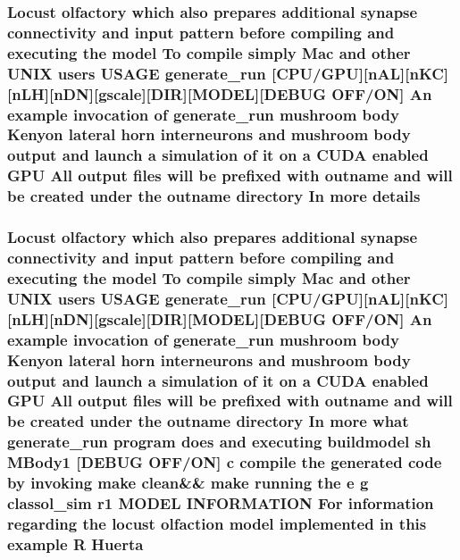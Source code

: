 \hypertarget{userproject_2MBody1__project_2README_8txt_a13ece3471fd6716c3062972374285e7d}{
\subsubsection[{details}]{\setlength{\rightskip}{0pt plus 5cm}Locust olfactory which also prepares additional synapse connectivity and input pattern before compiling and executing the {\bf model} To compile simply Mac and other U\+N\+I\+X users U\+S\+A\+G\+E {\bf generate\+\_\+run} \mbox{[}{\bf C\+P\+U}/{\bf G\+P\+U}\mbox{]}\mbox{[}n\+A\+L\mbox{]}\mbox{[}n\+K\+C\mbox{]}\mbox{[}n\+L\+H\mbox{]}\mbox{[}n\+D\+N\mbox{]}\mbox{[}gscale\mbox{]}\mbox{[}D\+I\+R\mbox{]}\mbox{[}M\+O\+D\+E\+L\mbox{]}\mbox{[}D\+E\+B\+U\+G O\+F\+F/O\+N\mbox{]} An example invocation of {\bf generate\+\_\+run} mushroom body Kenyon lateral horn {\bf interneurons} and mushroom body output and launch a simulation of {\bf it} on a C\+U\+D\+A enabled {\bf G\+P\+U} All output files will be prefixed {\bf with} outname and will be created under the outname {\bf directory} In more details}}\label{userproject_2MBody1__project_2README_8txt_a13ece3471fd6716c3062972374285e7d}
\hypertarget{userproject_2MBody1__project_2README_8txt_ac704e905c30eac9353bcc26d2526a599}{
\subsubsection[{Huerta}]{\setlength{\rightskip}{0pt plus 5cm}Locust olfactory which also prepares additional synapse connectivity and input pattern before compiling and executing the {\bf model} To compile simply Mac and other U\+N\+I\+X users U\+S\+A\+G\+E {\bf generate\+\_\+run} \mbox{[}{\bf C\+P\+U}/{\bf G\+P\+U}\mbox{]}\mbox{[}n\+A\+L\mbox{]}\mbox{[}n\+K\+C\mbox{]}\mbox{[}n\+L\+H\mbox{]}\mbox{[}n\+D\+N\mbox{]}\mbox{[}gscale\mbox{]}\mbox{[}D\+I\+R\mbox{]}\mbox{[}M\+O\+D\+E\+L\mbox{]}\mbox{[}D\+E\+B\+U\+G O\+F\+F/O\+N\mbox{]} An example invocation of {\bf generate\+\_\+run} mushroom body Kenyon lateral horn {\bf interneurons} and mushroom body output and launch a simulation of {\bf it} on a C\+U\+D\+A enabled {\bf G\+P\+U} All output files will be prefixed {\bf with} outname and will be created under the outname {\bf directory} In more what {\bf generate\+\_\+run} program does and executing buildmodel sh M\+Body1 \mbox{[}D\+E\+B\+U\+G O\+F\+F/O\+N\mbox{]} c compile the generated {\bf code} by invoking make clean\&\& make running the e g classol\+\_\+sim r1 M\+O\+D\+E\+L I\+N\+F\+O\+R\+M\+A\+T\+I\+O\+N For information regarding the locust olfaction {\bf model} implemented {\bf in} this example {\bf R} Huerta}}\label{userproject_2MBody1__project_2README_8txt_ac704e905c30eac9353bcc26d2526a599}
